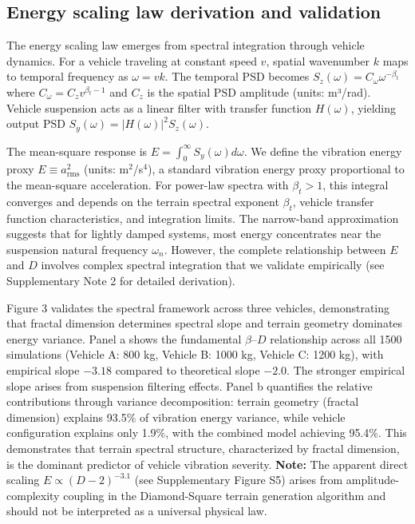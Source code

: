 \documentclass[11pt]{article}
\begin{document}
\subsection*{Energy scaling law derivation and validation}

The energy scaling law emerges from spectral integration through vehicle dynamics. For a vehicle traveling at constant speed $v$, spatial wavenumber $k$ maps to temporal frequency as $\omega = vk$\cite{Robson1979,Wong2022}. The temporal PSD becomes $S_z(\omega) = C_\omega \omega^{-\beta_t}$ where $C_\omega = C_z v^{\beta_t-1}$ and $C_z$ is the spatial PSD amplitude (units: m³/rad)\cite{Bendat2010}. Vehicle suspension acts as a linear filter with transfer function $H(\omega)$, yielding output PSD $S_y(\omega) = |H(\omega)|^2 S_z(\omega)$\cite{CrandallMark1963,Newland2005}.

The mean-square response is $E = \int_0^\infty S_y(\omega) d\omega$. We define the vibration energy proxy $E \equiv a_{\mathrm{rms}}^2$ (units: m$^2$/s$^4$), a standard vibration energy proxy proportional to the mean-square acceleration. For power-law spectra with $\beta_t > 1$, this integral converges and depends on the terrain spectral exponent $\beta_t$, vehicle transfer function characteristics, and integration limits. The narrow-band approximation\cite{Miles1954,Crandall1962} suggests that for lightly damped systems, most energy concentrates near the suspension natural frequency $\omega_n$. However, the complete relationship between $E$ and $D$ involves complex spectral integration that we validate empirically (see Supplementary Note 2 for detailed derivation).

Figure 3 validates the spectral framework across three vehicles, demonstrating that fractal dimension determines spectral slope and terrain geometry dominates energy variance. Panel a shows the fundamental $\beta$--$D$ relationship across all 1500 simulations (Vehicle A: 800 kg, Vehicle B: 1000 kg, Vehicle C: 1200 kg), with empirical slope $-3.18$ compared to theoretical slope $-2.0$. The stronger empirical slope arises from suspension filtering effects. Panel b quantifies the relative contributions through variance decomposition: terrain geometry (fractal dimension) explains 93.5\% of vibration energy variance, while vehicle configuration explains only 1.9\%, with the combined model achieving 95.4\%. This demonstrates that terrain spectral structure, characterized by fractal dimension, is the dominant predictor of vehicle vibration severity. \textbf{Note:} The apparent direct scaling $E \propto (D-2)^{-3.1}$ (see Supplementary Figure S5) arises from amplitude-complexity coupling in the Diamond-Square terrain generation algorithm and should not be interpreted as a universal physical law.
\end{document}
